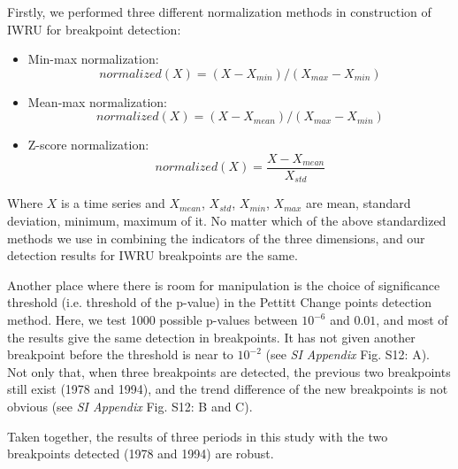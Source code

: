 \documentclass[9pt,twoside,lineno]{pnas-new}
\begin{document}
Firstly, we performed three different normalization methods in construction of IWRU for breakpoint detection:

\begin{itemize}
    \item Min-max normalization:
        $$ normalized(X) = (X - X_{min}) / (X_{max} - X_{min}) $$
    \item Mean-max normalization:
        $$ normalized(X) = (X - X_{mean}) / (X_{max} - X_{min}) $$
    \item Z-score normalization:
        $$ normalized(X) = \frac{X-X_{mean}}{X_{std}} $$ 
\end{itemize}

Where $X$ is a time series and $X_{mean}$, $X_{std}$, $X_{min}$, $X_{max}$ are mean, standard deviation, minimum, maximum of it.
No matter which of the above standardized methods we use in combining the indicators of the three dimensions, and our detection results for IWRU breakpoints are the same.

Another place where there is room for manipulation is the choice of significance threshold (i.e. threshold of the p-value) in the Pettitt Change points detection method. Here, we test 1000 possible p-values between $10^{-6}$ and $0.01$, and most of the results give the same detection in breakpoints. 
It has not given another breakpoint before the threshold is near to $10^{-2}$ (see \textit{SI Appendix} Fig. S12: A). 
Not only that, when three breakpoints are detected, the previous two breakpoints still exist (1978 and 1994), and the trend difference of the new breakpoints is not obvious (see \textit{SI Appendix} Fig. S12: B and C).

Taken together, the results of three periods in this study with the two breakpoints detected (1978 and 1994) are robust.

\end{document}
